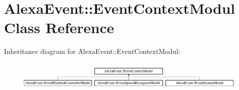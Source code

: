 \hypertarget{classAlexaEvent_1_1EventContextModul}{}\section{Alexa\+Event\+:\+:Event\+Context\+Modul Class Reference}
\label{classAlexaEvent_1_1EventContextModul}
Inheritance diagram for Alexa\+Event\+:\+:Event\+Context\+Modul\+:\begin{figure}[H]
\begin{center}
\leavevmode
\includegraphics[height=1.408805cm]{d2/df3/classAlexaEvent_1_1EventContextModul}
\end{center}
\end{figure}
